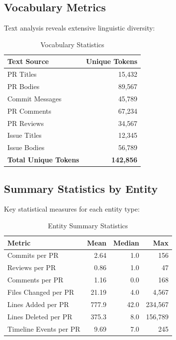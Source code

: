 \documentclass[11pt]{article}
\begin{document}
\subsection{Vocabulary Metrics}

Text analysis reveals extensive linguistic diversity:

\begin{table}[H]
\centering
\caption{Vocabulary Statistics}
\label{tab:vocab}
\begin{tabular}{@{}lr@{}}
\toprule
\textbf{Text Source} & \textbf{Unique Tokens} \\
\midrule
PR Titles & 15,432 \\
PR Bodies & 89,567 \\
Commit Messages & 45,789 \\
PR Comments & 67,234 \\
PR Reviews & 34,567 \\
Issue Titles & 12,345 \\
Issue Bodies & 56,789 \\
\midrule
\textbf{Total Unique Tokens} & \textbf{142,856} \\
\bottomrule
\end{tabular}
\end{table}

\subsection{Summary Statistics by Entity}

Key statistical measures for each entity type:

\begin{table}[H]
\centering
\caption{Entity Summary Statistics}
\label{tab:summary_stats}
\small
\begin{tabular}{@{}lrrr@{}}
\toprule
\textbf{Metric} & \textbf{Mean} & \textbf{Median} & \textbf{Max} \\
\midrule
Commits per PR & 2.64 & 1.0 & 156 \\
Reviews per PR & 0.86 & 1.0 & 47 \\
Comments per PR & 1.16 & 0.0 & 168 \\
Files Changed per PR & 21.19 & 4.0 & 4,567 \\
Lines Added per PR & 777.9 & 42.0 & 234,567 \\
Lines Deleted per PR & 375.3 & 8.0 & 156,789 \\
Timeline Events per PR & 9.69 & 7.0 & 245 \\
\bottomrule
\end{tabular}
\end{table}
\end{document}
